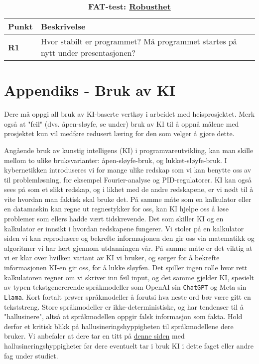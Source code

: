 \begin{table}[H]
    \centering
    \caption*{\textbf{\textcolor{RWTHrot100}{FAT-test}: \underline{Robusthet}}}
    \begin{tabular}{@{}  |p{1.25cm}| p{12.25cm}|  @{}}
    \hline
      \textbf{Punkt}             & \textbf{Beskrivelse} \\
    \hline
    \textbf{\textcolor{RWTHrot100}{R1}} & Hvor stabilt er programmet? Må programmet startes på nytt under presentasjonen?\\\cline{1-2} 
    \end{tabular}
\end{table}

\section{Appendiks - Bruk av KI}\label{sec:KI}

Dere må oppgi all bruk av KI-baserte vertkøy i arbeidet med heisprosjektet. 
Merk også at "feil" (dvs. åpen-sløyfe, se under) bruk av KI til å oppnå målene med prosjektet kun vil medføre redusert læring for den som velger å gjøre dette. 

Angående bruk av kunstig intelligens (KI) i programvareutvikling, kan man skille mellom to ulike bruksvarianter: åpen-sløyfe-bruk, og lukket-sløyfe-bruk. I kybernetikken introduseres vi for mange ulike redskap som vi kan benytte oss av til problemløsning, for eksempel Fourier-analyse og PID-regulatorer. KI kan også sees på som et slikt redskap, og i likhet med de andre redskapene, er vi nødt til å vite hvordan man faktisk skal bruke det. På samme måte som en kalkulator eller en datamaskin kan regne ut regnestykker for oss, kan KI hjelpe oss å løse problemer som ellers hadde vært tidskrevende. Det som skiller KI og en kalkulator er innsikt i hvordan redskapene fungerer. Vi stoler på en kalkulator siden vi kan reprodusere og bekrefte informasjonen den gir oss via matematikk og algoritmer vi har lært gjennom utdanningen vår. På samme måte er det viktig at vi er klar over hvilken variant av KI vi bruker, og sørger for å bekrefte informasjonen KI-en gir oss, for å lukke sløyfen. Det spiller ingen rolle hvor rett kalkulatoren regner om vi skriver inn feil input, og det samme gjelder KI, spesielt av typen tekstgenererende språkmodeller som OpenAI sin \verb|ChatGPT| og Meta sin \verb|Llama|. Kort fortalt prøver språkmodeller å forutsi hva neste ord bør være gitt en tekststreng. Store språkmodeller er ikke-deterministiske, og har tendenser til å "hallusinere", altså at språkmodellen oppgir falsk informasjon som fakta. Hold derfor et kritisk blikk på hallusineringshyppigheten til språkmodellene dere bruker. Vi anbefaler at dere tar en titt på \href{https://huggingface.co/spaces/vectara/leaderboard}{denne siden} med hallusineringshyppigheter før dere eventuelt tar i bruk KI i dette faget eller andre fag under studiet.

